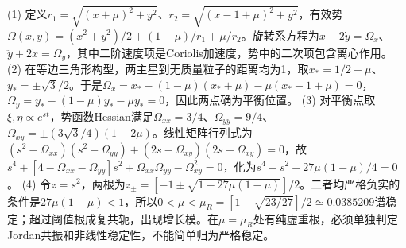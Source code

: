 (1) 定义\(r_1=\sqrt{(x+\mu)^2+y^2}\)、\(r_2=\sqrt{(x-1+\mu)^2+y^2}\)，有效势\(\Omega(x,y)=(x^2+y^2)/2+(1-\mu)/r_1+\mu/r_2\)。旋转系方程为\(\ddot x-2\dot y=\Omega_x\)、\(\ddot y+2\dot x=\Omega_y\)，其中二阶速度项是Coriolis加速度，势中的二次项包含离心作用。
(2) 在等边三角形构型，两主星到无质量粒子的距离均为1，取\(x_*=1/2-\mu\)、\(y_*=\pm\sqrt3/2\)。于是\(\Omega_x=x_*-(1-\mu)(x_*+\mu)-\mu(x_*-1+\mu)=0\)，\(\Omega_y=y_*-(1-\mu)y_*-\mu y_*=0\)，因此两点确为平衡位置。
(3) 对平衡点取\(\xi,\eta\propto e^{st}\)，势函数Hessian满足\(\Omega_{xx}=3/4\)、\(\Omega_{yy}=9/4\)、\(\Omega_{xy}=\pm(3\sqrt3/4)(1-2\mu)\)。线性矩阵行列式为\((s^2-\Omega_{xx})(s^2-\Omega_{yy})+(2s-\Omega_{xy})(2s+\Omega_{xy})=0\)，故\(s^4+[4-\Omega_{xx}-\Omega_{yy}]s^2+\Omega_{xx}\Omega_{yy}-\Omega_{xy}^2=0\)，化为\(s^4+s^2+27\mu(1-\mu)/4=0\)。
(4) 令\(z=s^2\)，两根为\(z_\pm=[-1\pm\sqrt{1-27\mu(1-\mu)}]/2\)。二者均严格负实的条件是\(27\mu(1-\mu)<1\)，所以\(0<\mu<\mu_R=[1-\sqrt{23/27}]/2\simeq0.0385209\)谱稳定；超过阈值根成复共轭，出现增长模。在\(\mu=\mu_R\)处有纯虚重根，必须单独判定Jordan共振和非线性稳定性，不能简单归为严格稳定。
